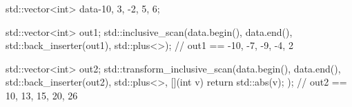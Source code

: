 \begin{box-note}
\begin{cppcode}
std::vector<int> data{-10, 3, -2, 5, 6};

std::vector<int> out1;
std::inclusive_scan(data.begin(), data.end(), std::back_inserter(out1), 
                    std::plus<>{});
// out1 == {-10, -7, -9, -4, 2}

std::vector<int> out2;
std::transform_inclusive_scan(data.begin(), data.end(), std::back_inserter(out2), 
                              std::plus<>{}, [](int v) { return std::abs(v); });
// out2 == {10, 13, 15, 20, 26}
\end{cppcode}
\end{box-note}

